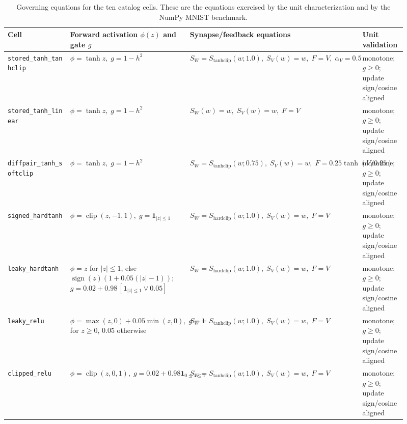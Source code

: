 \documentclass[11pt]{article}
\newcommand{\code}[1]{\texttt{#1}}
\begin{document}
\begin{table}[H]
  \centering
  \caption{Governing equations for the ten catalog cells.  These are the
  equations exercised by the unit characterization and by the NumPy MNIST
  benchmark.}
  \label{tab:cell-equations}
  \scriptsize
  \begin{tabular}{>{\raggedright\arraybackslash}p{0.23\linewidth}
                  >{\raggedright\arraybackslash}p{0.27\linewidth}
                  >{\raggedright\arraybackslash}p{0.27\linewidth}
                  >{\raggedright\arraybackslash}p{0.14\linewidth}}
    \toprule
    Cell & Forward activation \(\phi(z)\) and gate \(g\) & Synapse/feedback equations & Unit validation \\
    \midrule
    \code{stored\_tanh\_tanhclip} &
    \(\phi=\tanh z,\; g=1-h^2\) &
    \(S_W=S_{\mathrm{tanhclip}}(w;1.0),\; S_V(w)=w,\; F=V,\; \alpha_V=0.5\) &
    monotone; \(g\ge0\); update sign/cosine aligned \\
    \addlinespace
    \code{stored\_tanh\_linear} &
    \(\phi=\tanh z,\; g=1-h^2\) &
    \(S_W(w)=w,\; S_V(w)=w,\; F=V\) &
    monotone; \(g\ge0\); update sign/cosine aligned \\
    \addlinespace
    \code{diffpair\_tanh\_softclip} &
    \(\phi=\tanh z,\; g=1-h^2\) &
    \(S_W=S_{\mathrm{tanhclip}}(w;0.75),\; S_V(w)=w,\; F=0.25\tanh(V/0.25)\) &
    monotone; \(g\ge0\); update sign/cosine aligned \\
    \addlinespace
    \code{signed\_hardtanh} &
    \(\phi=\operatorname{clip}(z,-1,1),\;
      g=\mathbf{1}_{|z|\le1}\) &
    \(S_W=S_{\mathrm{hardclip}}(w;1.0),\; S_V(w)=w,\; F=V\) &
    monotone; \(g\ge0\); update sign/cosine aligned \\
    \addlinespace
    \code{leaky\_hardtanh} &
    \(\phi=z\) for \(|z|\le1\), else
    \(\operatorname{sign}(z)(1+0.05(|z|-1))\);
    \(g=0.02+0.98\,[\mathbf{1}_{|z|\le1}\vee0.05]\) &
    \(S_W=S_{\mathrm{hardclip}}(w;1.0),\; S_V(w)=w,\; F=V\) &
    monotone; \(g\ge0\); update sign/cosine aligned \\
    \addlinespace
    \code{leaky\_relu} &
    \(\phi=\max(z,0)+0.05\min(z,0),\;
      g=1\) for \(z\ge0\), \(0.05\) otherwise &
    \(S_W=S_{\mathrm{tanhclip}}(w;1.0),\; S_V(w)=w,\; F=V\) &
    monotone; \(g\ge0\); update sign/cosine aligned \\
    \addlinespace
    \code{clipped\_relu} &
    \(\phi=\operatorname{clip}(z,0,1),\;
      g=0.02+0.98\mathbf{1}_{0\le z\le1}\) &
    \(S_W=S_{\mathrm{tanhclip}}(w;1.0),\; S_V(w)=w,\; F=V\) &
    monotone; \(g\ge0\); update sign/cosine aligned \\

\end{tabular}
\end{table}
\end{document}
